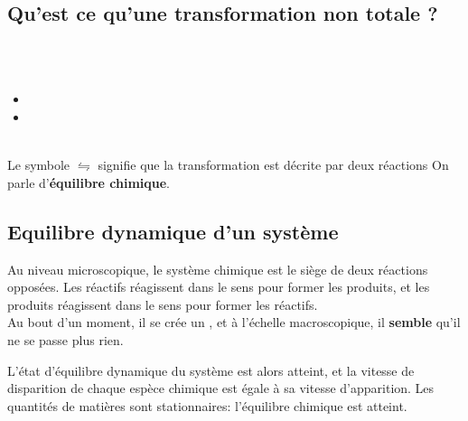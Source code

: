 \subsection{Qu'est ce qu'une transformation non totale ?}

 \\
\\
\begin{itemize}
\item {}
\item {}
\end{itemize}

 \\

Le symbole $\leftrightharpoons$   signifie que la transformation est décrite par deux réactions   On parle d'\textbf{équilibre chimique}.

\subsection{Equilibre dynamique d'un système}
Au niveau microscopique, le système chimique est le siège de deux réactions opposées. Les réactifs réagissent dans le sens  pour former les produits, et les produits réagissent dans le sens  pour former les réactifs.\\
Au bout d'un moment, il se crée un , et à l'échelle macroscopique, il \textbf{semble} qu'il ne se passe plus rien. 

L'état d'équilibre dynamique du système est alors atteint, et la vitesse de disparition de chaque espèce chimique est égale à sa vitesse d'apparition. Les quantités de matières sont stationnaires: l'équilibre chimique est atteint.
